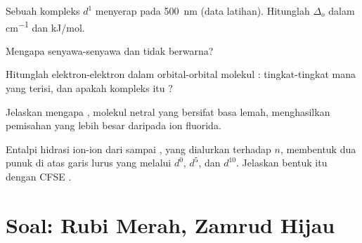 \begin{exercise}[$\star\star$]\label{exo:b2:ligand-field:8}
Sebuah kompleks $d^1$ menyerap pada \qty{500}{nm} (data latihan). Hitunglah
$\Delta_o$ dalam \unit{cm^{-1}} dan
\unit{kJ/mol}.
\end{exercise}

\begin{exercise}[$\star\star$]\label{exo:b2:ligand-field:9}
Mengapa senyawa-senyawa  dan  tidak berwarna?
\end{exercise}

\begin{exercise}[$\star\star\star$]\label{exo:b2:ligand-field:10}
Hitunglah elektron-elektron dalam orbital-orbital molekul :
tingkat-tingkat mana yang terisi, dan apakah kompleks itu ?
\end{exercise}

\begin{exercise}[$\star\star\star$]\label{exo:b2:ligand-field:11}
Jelaskan mengapa , molekul netral yang bersifat basa lemah,
menghasilkan pemisahan yang lebih besar daripada ion fluorida.
\end{exercise}

\begin{exercise}[$\star\star\star$]\label{exo:b2:ligand-field:12}
Entalpi hidrasi ion-ion  dari  sampai , yang
dialurkan terhadap $n$, membentuk dua punuk di atas garis lurus yang melalui
$d^0$, $d^5$, dan $d^{10}$. Jelaskan bentuk itu dengan CFSE .
\end{exercise}

\section{Soal: Rubi Merah, Zamrud Hijau}

